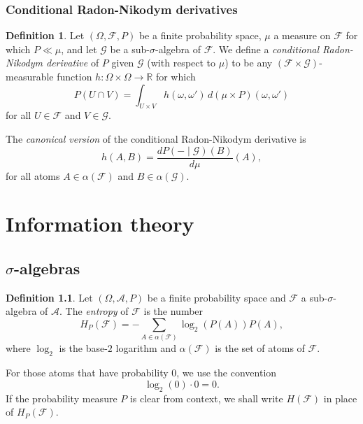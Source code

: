 \documentclass[11pt]{book}
\theoremstyle{definition}
\newtheorem{defn}[thm]{Definition}
\numberwithin{equation}{section}
\begin{document}
\subsection{Conditional Radon-Nikodym derivatives}
\begin{defn}
	Let $(\Omega,\mathcal{F},P)$ be a finite probability space, $\mu$ a measure on $\mathcal{F}$ for which $P \ll \mu$, and let $\mathcal{G}$ be a sub-$\sigma$-algebra of $\mathcal{F}$. We define a \textit{conditional Radon-Nikodym derivative} of $P$ given $\mathcal{G}$ (with respect to $\mu$) to be any $(\mathcal{F} \times \mathcal{G})$-measurable function $h: \Omega \times \Omega \to \mathbb{R}$ for which
	\[
		P(U\cap V)  = \int_{U\times V} h(\omega,\omega') \, d(\mu \times P)(\omega,\omega')
	\]
	for all $U\in \mathcal{F}$ and $V\in \mathcal{G}$.
\end{defn}

The \textit{canonical version} of the conditional Radon-Nikodym derivative is
\[
	h(A,B) = \frac{dP(-\mid \mathcal{G})(B)}{d\mu}(A),
\]
for all atoms $A\in \alpha(\mathcal{F})$ and $B\in \alpha(\mathcal{G})$.






\chapter{Information theory}

\section{\texorpdfstring{$\sigma$-algebras}{sigma-algebras}}

\begin{defn}
	Let $(\Omega,\mathcal{A},P)$ be a finite probability space and $\mathcal{F}$ a sub-$\sigma$-algebra of $\mathcal{A}$. The \textit{entropy} of $\mathcal{F}$ is the number
	\[
		H_P(\mathcal{F}) = - \sum_{A\in \alpha(\mathcal{F})} \log_2{\left(P(A)\right)} P(A),
	\]
	where $\log_2$ is the base-$2$ logarithm and $\alpha(\mathcal{F})$ is the set of atoms of $\mathcal{F}$.
\end{defn}

For those atoms that have probability $0$, we use the convention
\begin{equation}\label{eq:entropy-convention}
	\log_2(0)\cdot 0 =0.
\end{equation}
If the probability measure $P$ is clear from context, we shall write $H(\mathcal{F})$ in place of $H_P(\mathcal{F})$.
\end{document}
